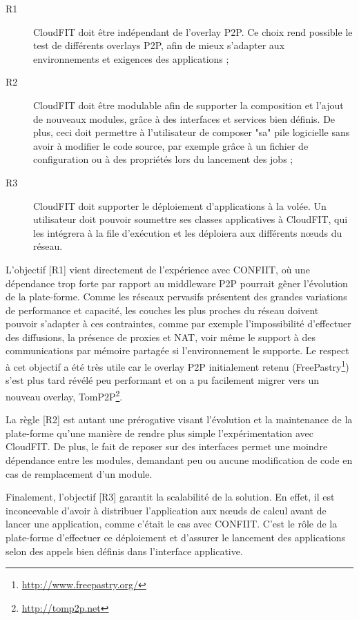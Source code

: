\begin{description}
	\item [R1] CloudFIT doit être indépendant de l'overlay P2P. Ce choix rend possible le test de différents overlays P2P, afin de mieux s'adapter aux environnements et exigences des applications ;
	\item [R2] CloudFIT doit être modulable afin de supporter la composition et l'ajout de nouveaux modules, grâce à des interfaces et services bien définis. De plus, ceci doit permettre à l'utilisateur de composer "sa" pile logicielle sans avoir à modifier le code source, par exemple grâce à un fichier de configuration ou à des propriétés lors du lancement des jobs ;
	\item [R3] CloudFIT doit supporter le déploiement d'applications à la volée. Un utilisateur doit pouvoir soumettre ses classes applicatives à CloudFIT, qui les intégrera à la file d'exécution et les déploiera aux différents n{\oe}uds du réseau.
\end{description} 


L'objectif [R1] vient directement de l'expérience avec CONFIIT, où une dépendance trop forte par rapport au middleware P2P pourrait gêner l'évolution de la plate-forme. Comme les réseaux pervasifs présentent des grandes variations de performance et capacité, les couches les plus proches du réseau doivent pouvoir s'adapter à ces contraintes, comme par exemple l'impossibilité d'effectuer des diffusions, la présence de proxies et NAT, voir même le support à des communications par mémoire partagée si l'environnement le supporte. Le respect à cet objectif a été très utile car le overlay P2P initialement retenu (FreePastry\footnote{\url{http://www.freepastry.org/}}) s'est plus tard révélé peu performant et on a pu facilement migrer vers un nouveau overlay, TomP2P\footnote{\url{http://tomp2p.net}}. 

La règle [R2] est autant une prérogative visant l'évolution et la maintenance de la plate-forme qu'une manière de rendre plus simple l'expérimentation avec CloudFIT. De plus, le fait de reposer sur des interfaces permet une moindre dépendance entre les modules, demandant peu ou aucune modification de code en cas de remplacement d'un module. 

Finalement, l'objectif [R3] garantit la scalabilité de la solution. En effet, il est inconcevable d'avoir à distribuer l'application aux n{\oe}uds de calcul avant de lancer une application, comme c'était le cas avec CONFIIT. C'est le rôle de la plate-forme d'effectuer ce déploiement et d'assurer le lancement des applications selon des appels bien définis dans l'interface applicative. 

